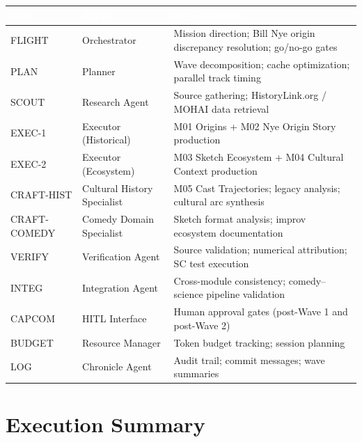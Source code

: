 \documentclass[11pt,letterpaper]{article}
\newcommand{\tableheader}[1]{\textbf{\sffamily\textcolor{white}{#1}}}
\begin{document}
\begin{center}
\begin{tabularx}{\textwidth}{L{2cm}L{3cm}X}
\toprule
{}
\tableheader{Role} & \tableheader{Agent} & \tableheader{Responsibility} \\
\midrule
FLIGHT & Orchestrator & Mission direction; Bill Nye origin discrepancy resolution; go/no-go gates \\
PLAN & Planner & Wave decomposition; cache optimization; parallel track timing \\
SCOUT & Research Agent & Source gathering; HistoryLink.org / MOHAI data retrieval \\
EXEC-1 & Executor (Historical) & M01 Origins + M02 Nye Origin Story production \\
EXEC-2 & Executor (Ecosystem) & M03 Sketch Ecosystem + M04 Cultural Context production \\
CRAFT-HIST & Cultural History Specialist & M05 Cast Trajectories; legacy analysis; cultural arc synthesis \\
CRAFT-COMEDY & Comedy Domain Specialist & Sketch format analysis; improv ecosystem documentation \\
VERIFY & Verification Agent & Source validation; numerical attribution; SC test execution \\
INTEG & Integration Agent & Cross-module consistency; comedy--science pipeline validation \\
CAPCOM & HITL Interface & Human approval gates (post-Wave 1 and post-Wave 2) \\
BUDGET & Resource Manager & Token budget tracking; session planning \\
LOG & Chronicle Agent & Audit trail; commit messages; wave summaries \\
\bottomrule
\end{tabularx}
\end{center}

\section{Execution Summary}
\end{document}
